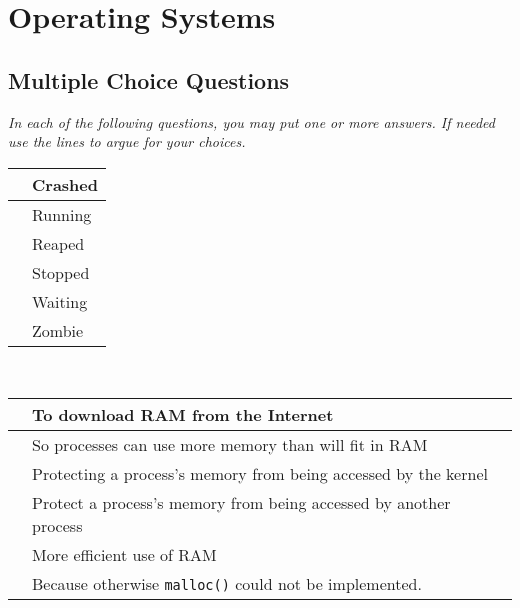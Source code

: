 
\section{Operating Systems}

\subsection{Multiple Choice Questions}
\emph{In each of the following questions, you may put one or more answers. If needed use the lines to argue for your choices.}

\begin{question}
\begin{tabular}{|p{2cm}|p{12cm}|} \hline
  & Crashed \\ \hline
  & Running \\ \hline
  & Reaped \\ \hline
  & Stopped \\ \hline
  & Waiting \\ \hline
  & Zombie \\ \hline
\end{tabular}

~


\end{question}

\begin{question}
\begin{tabular}{|p{2cm}|p{12cm}|} \hline
  & To download RAM from the Internet \\ \hline
  & So processes can use more memory than will fit in RAM \\ \hline
  & Protecting a process's memory from being accessed by the kernel \\ \hline
  & Protect a process's memory from being accessed by another process \\ \hline
  & More efficient use of RAM \\ \hline
  & Because otherwise \texttt{malloc()} could not be implemented. \\ \hline
\end{tabular}

~

\end{question}

